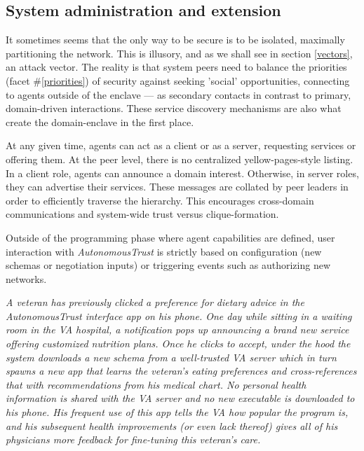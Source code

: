 \documentclass[10pt, twoside]{article}
\newenvironment{ppl}{\fontfamily{ppl}\selectfont\itshape}{\par}
\newcommand{\projectName}{\emph{AutonomousTrust }}
\begin{document}
\subsection{System administration and extension} \label{admin}

It sometimes seems that the only way to be secure is to be isolated, maximally partitioning the network. This is illusory, and as we shall see in section \ref{vectors}, an attack vector. The reality is that system peers need to balance the priorities (facet \#\ref{priorities}) of security against seeking 'social' opportunities, connecting to agents outside of the enclave --- as secondary contacts in contrast to primary, domain-driven interactions. These service discovery mechanisms are also what create the domain-enclave in the first place.

At any given time, agents can act as a client or as a server, requesting services or offering them. At the peer level, there is no centralized yellow-pages-style listing. In a client role, agents can announce a domain interest. Otherwise, in server roles, they can advertise their services. These messages are collated by peer leaders in order to efficiently traverse the hierarchy. This encourages cross-domain communications and system-wide trust versus clique-formation.

Outside of the programming phase where agent capabilities are defined, user interaction with \projectName is strictly based on configuration (new schemas or negotiation inputs) or triggering events such as authorizing new networks.

\begin{ppl}
A veteran has previously clicked a preference for dietary advice in the \projectName interface app on his phone. One day while sitting in a waiting room in the VA hospital, a notification pops up announcing a brand new service offering customized nutrition plans. Once he clicks to accept, under the hood the system downloads a new schema from a well-trusted VA server which in turn spawns a new app that learns the veteran's eating preferences and cross-references that with recommendations from his medical chart. \emph{No} personal health information is shared with the VA server and \emph{no} new executable is downloaded to his phone. His frequent use of this app tells the VA how popular the program is, and his subsequent health improvements (or even lack thereof) gives all of his physicians more feedback for fine-tuning this veteran's care.
\end{ppl}
\end{document}
